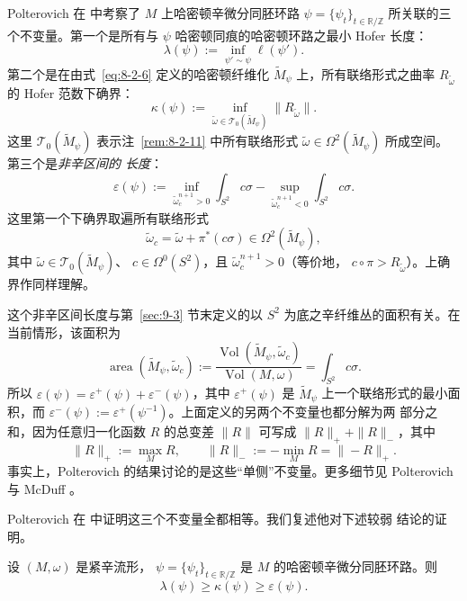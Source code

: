 Polterovich 在  中考察了 $M$ 上哈密顿辛微分同胚环路
$\psi=\{\psi_t\}_{t\in\mathbb R/\mathbb Z}$ 所关联的三个不变量。第一个是所有与
$\psi$ 哈密顿同痕的哈密顿环路之最小 Hofer 长度：
\[
  \lambda(\psi):=\inf_{\psi'\sim\psi}\ell(\psi').
\]
第二个是在由式~\eqref{eq:8-2-6} 定义的哈密顿纤维化
$\widetilde M_\psi$ 上，所有联络形式之曲率 $R_{\widetilde\omega}$ 的 Hofer 范数下确界：
\[
  \kappa(\psi):=
  \inf_{\widetilde\omega\in\mathcal T_0(\widetilde M_\psi)}
  \|R_{\widetilde\omega}\|.
\]
这里 $\mathcal T_0(\widetilde M_\psi)$ 表示注~\ref{rem:8-2-11} 中所有联络形式
$\widetilde\omega\in\Omega^2(\widetilde M_\psi)$ 所成空间。第三个是\emph{非辛区间的
长度}：
\[
  \varepsilon(\psi):=
  \inf_{\widetilde\omega_c^{n+1}>0}\int_{S^2}c\sigma
  -\sup_{\widetilde\omega_c^{n+1}<0}\int_{S^2}c\sigma.
\]
这里第一个下确界取遍所有联络形式
\[
  \widetilde\omega_c
  =\widetilde\omega+\pi^*(c\sigma)
  \in\Omega^2(\widetilde M_\psi),
\]
其中 $\widetilde\omega\in\mathcal T_0(\widetilde M_\psi)$、
$c\in\Omega^0(S^2)$，且 $\widetilde\omega_c^{n+1}>0$（等价地，
$c\circ\pi>R_{\widetilde\omega}$）。上确界作同样理解。

\begin{remark}\label{rem:9-6-2}
这个非辛区间长度与第~\ref{sec:9-3} 节末定义的以 $S^2$ 为底之辛纤维丛的面积有关。在
当前情形，该面积为
\[
  \operatorname{area}(\widetilde M_\psi,\widetilde\omega_c)
  :=\frac{\operatorname{Vol}(\widetilde M_\psi,\widetilde\omega_c)}
    {\operatorname{Vol}(M,\omega)}
  =\int_{S^2}c\sigma.
\]
所以
$\varepsilon(\psi)=\varepsilon^+(\psi)+\varepsilon^-(\psi)$，其中
$\varepsilon^+(\psi)$ 是 $\widetilde M_\psi$ 上一个联络形式的最小面积，而
$\varepsilon^-(\psi):=\varepsilon^+(\psi^{-1})$。上面定义的另两个不变量也都分解为两
部分之和，因为任意归一化函数 $R$ 的总变差 $\|R\|$ 可写成
$\|R\|_++\|R\|_-$，其中
\[
  \|R\|_+:=\max_MR,
  \qquad \|R\|_-:=-\min_MR=\|-R\|_+.
\]
事实上，Polterovich 的结果讨论的是这些“单侧”不变量。更多细节见 Polterovich
 与 McDuff 。
\end{remark}

Polterovich 在  中证明这三个不变量全都相等。我们复述他对下述较弱
结论的证明。

\begin{proposition}[Polterovich]\label{prop:9-6-3}
设 $(M,\omega)$ 是紧辛流形，
$\psi=\{\psi_t\}_{t\in\mathbb R/\mathbb Z}$ 是 $M$ 的哈密顿辛微分同胚环路。则
\[
  \lambda(\psi)\ge\kappa(\psi)\ge\varepsilon(\psi).
\]
\end{proposition}

